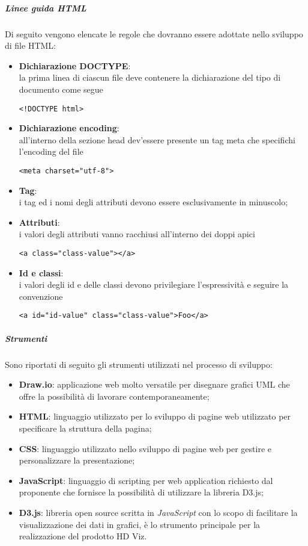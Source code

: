 \subparagraph{Linee guida HTML}
\label{par:convenzioni_html}

Di seguito vengono elencate le regole che dovranno essere adottate nello sviluppo di file HTML:
\begin{itemize}
	\item \textbf{Dichiarazione DOCTYPE}:\\
		la prima linea di ciascun file deve contenere la dichiarazione del tipo di documento come segue\\
		\begin{lstlisting}[style=html]
			<!DOCTYPE html>
		\end{lstlisting}
	\item \textbf{Dichiarazione encoding}:\\
		all'interno della sezione head dev'essere presente un tag meta che specifichi l'encoding del file
		\begin{lstlisting}[style=html]
			<meta charset="utf-8">
		\end{lstlisting}
	\item \textbf{Tag}:\\
		i tag ed i nomi degli attributi devono essere esclusivamente in minuscolo;
	\item \textbf{Attributi}:\\
		i valori degli attributi vanno racchiusi all'interno dei doppi apici
		\begin{lstlisting}[style=html]
			<a class="class-value"></a>
		\end{lstlisting}
	\item \textbf{Id e classi}:\\
		i valori degli id e delle classi devono privilegiare l'espressività e seguire la convenzione 
		\begin{lstlisting}[style=html]
			<a id="id-value" class="class-value">Foo</a>
		\end{lstlisting}
\end{itemize}

\subparagraph{Strumenti}

Sono riportati di seguito gli strumenti utilizzati nel processo di sviluppo:
\begin{itemize}
	\item \textbf{Draw.io}: applicazione web molto versatile per disegnare grafici UML che offre la possibilità di lavorare
		contemporaneamente;
	\item \textbf{HTML}: linguaggio utilizzato per lo sviluppo di pagine web utilizzato per specificare la struttura della pagina;
	\item \textbf{CSS}: linguaggio utilizzato nello sviluppo di pagine web per gestire e personalizzare la presentazione;
	\item \textbf{JavaScript}: linguaggio di scripting per web application richiesto dal proponente che fornisce la possibilità di
		utilizzare la libreria D3.js;
	\item \textbf{D3.js}: libreria open source scritta in \emph{JavaScript} con lo scopo di facilitare la visualizzazione dei dati in
		grafici, è lo strumento principale per la realizzazione del prodotto HD Viz.
\end{itemize}
